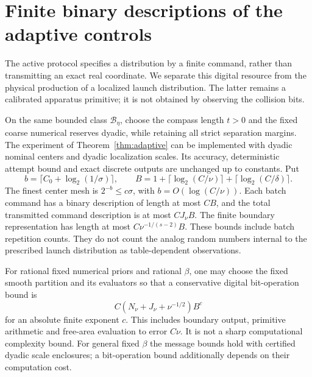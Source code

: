 \section{Finite binary descriptions of the adaptive controls}
\label{sec:digital}
The active protocol specifies a distribution by a finite command, rather
than transmitting an exact real coordinate. We separate this digital
resource from the physical production of a localized launch distribution.
The latter remains a calibrated apparatus primitive; it is not obtained
by observing the collision bits.

\begin{theorem}
\label{thm:digital}
On the same bounded class $\mathcal B_\eta$, choose the compass length
$t>0$ and the fixed coarse numerical reserves dyadic, while retaining
all strict separation margins. The experiment of
Theorem~\ref{thm:adaptive} can be implemented with dyadic nominal
centers and dyadic localization scales. Its accuracy, deterministic
attempt bound and exact discrete outputs are unchanged up to constants.
Put
\[
 b=\lceil C_0+\log_2(1/\sigma)\rceil,
 \qquad B=1+\lceil\log_2(C/\nu)\rceil
              +\lceil\log_2(C/\delta)\rceil .
\]
The finest center mesh is $2^{-b}\le c\sigma$, with
$b=O(\log(C/\nu))$. Each batch command has a binary description of
length at most $CB$, and the total transmitted command description is
at most $CJ_\nu B$. The finite boundary representation has length
at most $C\nu^{-1/(s-2)}B$. These bounds include batch repetition
counts. They do not count the analog random numbers internal to the
prescribed launch distribution as table-dependent observations.

For rational fixed numerical priors and rational $\beta$, one may
choose the fixed smooth partition and its evaluators so that a
conservative digital bit-operation bound is
\begin{equation}\label{eq:digital-work}
              C(N_\nu+J_\nu+\nu^{-1/2})B^c
\end{equation}
for an absolute finite exponent $c$. This includes boundary output,
primitive arithmetic and free-area evaluation to error $C\nu$.
It is not a sharp computational complexity bound. For general fixed
$\beta$ the message bounds hold with certified dyadic scale enclosures;
a bit-operation bound additionally depends on their computation cost.
\end{theorem}
